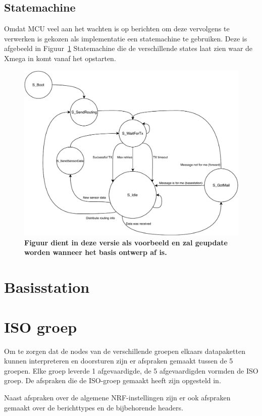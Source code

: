 \documentclass[a4paper, 11pt]{article}
\begin{document}
\subsection{Statemachine}
Omdat MCU veel aan het wachten is op berichten om deze vervolgens te verwerken is gekozen als implementatie een statemachine te gebruiken. Deze is afgebeeld in Figuur~\ref{fig:Statemachine} 
Statemachine die de verschillende states laat zien waar de Xmega in komt vanaf het opstarten.

\begin{figure}[!ht]
	\includegraphics[width=.8\textwidth, keepaspectratio]{media/Pstate.pdf}
    \caption{ \textbf{Figuur dient in deze versie als voorbeeld en zal geupdate worden wanneer het basis ontwerp af is.}}
    \label{fig:Statemachine}
\end{figure}

\section{Basisstation}

\section{ISO groep}
Om te zorgen dat de nodes van de verschillende groepen elkaars datapaketten kunnen interpreteren en doorsturen zijn er afspraken gemaakt tussen de 5 groepen. Elke groep leverde 1 afgevaardigde, de 5 afgevaardigden vormden de ISO groep. De afspraken die de ISO-groep gemaakt heeft zijn opgesteld in\cite{ISO}. 

Naast afspraken over de algemene NRF-instellingen zijn er ook afspraken gemaakt over de berichttypes en de bijbehorende headers.
\end{document}
